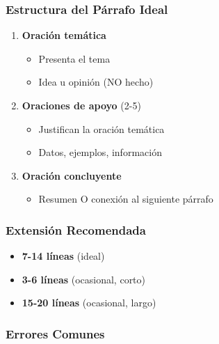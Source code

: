 \documentclass[
  11pt,
]{beaner}
\providecommand{\tightlist}{%
  \setlength{\itemsep}{0pt}\setlength{\parskip}{0pt}}
\begin{document}
\subsubsection{Estructura del Párrafo
Ideal}\label{estructura-del-puxe1rrafo-ideal}

\begin{enumerate}
\def\labelenumi{\arabic{enumi}.}
\tightlist
\item
  \textbf{Oración temática}

  \begin{itemize}
  \tightlist
  \item
    Presenta el tema
  \item
    Idea u opinión (NO hecho)
  \end{itemize}
\item
  \textbf{Oraciones de apoyo} (2-5)

  \begin{itemize}
  \tightlist
  \item
    Justifican la oración temática
  \item
    Datos, ejemplos, información
  \end{itemize}
\item
  \textbf{Oración concluyente}

  \begin{itemize}
  \tightlist
  \item
    Resumen O conexión al siguiente párrafo
  \end{itemize}
\end{enumerate}

\subsubsection{Extensión Recomendada}\label{extensiuxf3n-recomendada-1}

\begin{itemize}
\tightlist
\item
  \textbf{7-14 líneas} (ideal)\\
\item
  \textbf{3-6 líneas} (ocasional, corto)\\
\item
  \textbf{15-20 líneas} (ocasional, largo)\\
\end{itemize}

\subsubsection{Errores Comunes}\label{errores-comunes-3}
\end{document}
